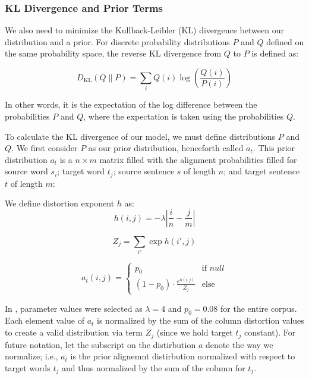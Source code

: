 \documentclass[twoside,twocolumn]{article}
\begin{document}
\subsubsection{KL Divergence and Prior Terms}

We also need to minimize the Kullback-Leibler (KL) divergence between our
distribution and a prior. For discrete probability distributions $P$ and $Q$
defined on the same probability space, the reverse KL divergence from $Q$ to
$P$ is defined as:

\begin{equation}
D_{\mathrm{KL}}(Q \| P) = \sum_{i} Q(i) \log \left( \frac{Q(i)}{P(i)} \right)
\end{equation}

In other words, it is the expectation of the log difference between the
probabilities $P$ and $Q$, where the expectation is taken using the
probabilities $Q$.

To calculate the KL divergence of our model, we must define
distributions $P$ and $Q$. We first consider $P$ as our prior
distribution, henceforth called $a_t$. This prior distribution $a_t$ is a
$n \times m$ matrix filled with the alignment probabilities filled for source
word $s_i$; target word $t_j$; source sentence $s$ of length $n$; and target
sentence $t$ of length $m$:

We define distortion exponent $h$ as:
\begin{equation}
  h(i, j) = {-\lambda \left| \frac{i}{n} - \frac{j}{m}\right|}
\end{equation}

\begin{equation}
  Z_j = \sum_{i'} \exp h(i', j)
\end{equation}

\begin{equation}
a_t (i, j) =
\begin{cases}
      p_0 & \text{if } null \\
     (1-p_0) \cdot \frac{e^{h(i,j)}}{Z_j} & \text{else}
   \end{cases}
\end{equation}

In \cite{dyer2013simple}, parameter values were selected as
$\lambda = 4$ and $p_0 = 0.08$ for the entire corpus.
Each element value of $a_t$ is normalized by the sum of the column distortion
values to create a valid distribution via term $Z_j$ (since we hold target $t_j$ constant). For future notation, let the subscript on the distirbution $a$ denote
the way we normalize; i.e., $a_t$ is the prior alignemnt distirbution normalized
with respect to target words $t_j$ and thus normalized by the sum of the column
for $t_j$.
\end{document}
